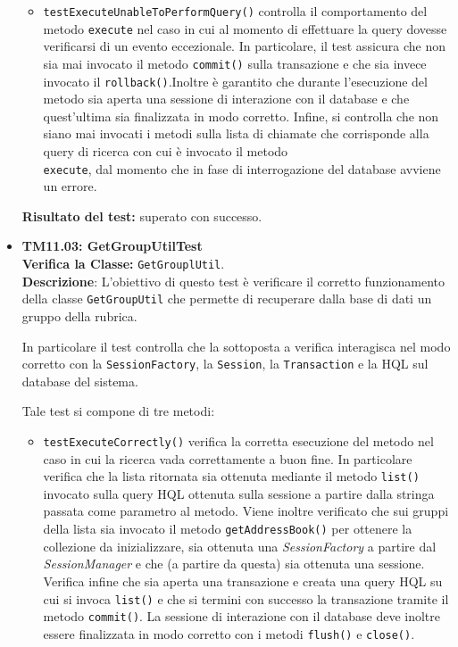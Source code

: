 \begin{itemize}
\begin{itemize}
\item \texttt{testExecuteUnableToPerformQuery()}
controlla il comportamento del metodo \texttt{execute} nel caso in cui al momento di effettuare la query dovesse verificarsi di un evento eccezionale. In particolare, il test assicura che non sia mai invocato il metodo \texttt{commit()} sulla transazione e che sia invece invocato il \texttt{rollback()}.Inoltre è garantito che durante l'esecuzione del metodo sia aperta una sessione di interazione con il database e che quest'ultima sia finalizzata in modo corretto. Infine, si controlla che non siano mai invocati i metodi sulla lista di chiamate che corrisponde alla query di ricerca con cui è invocato il metodo \\ \texttt{execute}, dal momento che in fase di interrogazione del database avviene un errore.

\end{itemize}
\textbf{Risultato del test:} superato con successo.

\item[\passed] \textbf{TM11.03: GetGroupUtilTest}\\
\textbf{Verifica la Classe:} \texttt{GetGrouplUtil}.\\
\textbf{Descrizione}: L'obiettivo di questo test è verificare il corretto funzionamento della classe \texttt{GetGroupUtil} che permette di recuperare dalla base di dati un gruppo della rubrica.

In particolare il test controlla che la  sottoposta a verifica interagisca nel modo corretto con la \texttt{SessionFactory}, la \texttt{Session}, la \texttt{Transaction} e la  HQL sul database del sistema.

Tale test si compone di tre metodi:
\begin{itemize}
\item \texttt{testExecuteCorrectly()} verifica la corretta esecuzione del metodo nel caso in cui la ricerca vada correttamente a buon fine. In particolare verifica che la lista ritornata sia ottenuta mediante il metodo \texttt{list()} invocato sulla query HQL ottenuta sulla sessione a partire dalla stringa passata come parametro al metodo.
Viene inoltre verificato che sui gruppi della lista sia invocato il metodo \texttt{getAddressBook()} per ottenere la collezione da inizializzare, sia ottenuta una \textit{SessionFactory} a partire dal \textit{SessionManager} e che (a partire da questa) sia ottenuta una sessione.
Verifica infine che sia aperta una transazione e creata una query HQL su cui si invoca \texttt{list()} e che si termini con successo la transazione tramite il metodo \texttt{commit()}.
La sessione di interazione con il database deve inoltre essere finalizzata in modo corretto con i metodi \texttt{flush()} e \texttt{close()}.


\end{itemize}
\end{itemize}
